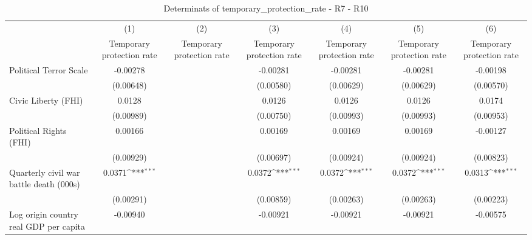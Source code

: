 \begin{table}[htbp]\centering
\def\sym#1{\ifmmode^{#1}\else\(^{#1}\)\fi}
\caption{Determinats of temporary\_protection\_rate - R7 - R10}
\begin{tabular}{l*{6}{c}}
\hline\hline
                    &\multicolumn{1}{c}{(1)}&\multicolumn{1}{c}{(2)}&\multicolumn{1}{c}{(3)}&\multicolumn{1}{c}{(4)}&\multicolumn{1}{c}{(5)}&\multicolumn{1}{c}{(6)}\\
                    &\multicolumn{1}{c}{Temporary protection rate}&\multicolumn{1}{c}{Temporary protection rate}&\multicolumn{1}{c}{Temporary protection rate}&\multicolumn{1}{c}{Temporary protection rate}&\multicolumn{1}{c}{Temporary protection rate}&\multicolumn{1}{c}{Temporary protection rate}\\
\hline
Political Terror Scale&    -0.00278         &                     &    -0.00281         &    -0.00281         &    -0.00281         &    -0.00198         \\
                    &   (0.00648)         &                     &   (0.00580)         &   (0.00629)         &   (0.00629)         &   (0.00570)         \\
[1em]
Civic Liberty (FHI) &      0.0128         &                     &      0.0126         &      0.0126         &      0.0126         &      0.0174         \\
                    &   (0.00989)         &                     &   (0.00750)         &   (0.00993)         &   (0.00993)         &   (0.00953)         \\
[1em]
Political Rights (FHI)&     0.00166         &                     &     0.00169         &     0.00169         &     0.00169         &    -0.00127         \\
                    &   (0.00929)         &                     &   (0.00697)         &   (0.00924)         &   (0.00924)         &   (0.00823)         \\
[1em]
Quarterly civil war battle death (000s)&      0.0371\sym{***}&                     &      0.0372\sym{***}&      0.0372\sym{***}&      0.0372\sym{***}&      0.0313\sym{***}\\
                    &   (0.00291)         &                     &   (0.00859)         &   (0.00263)         &   (0.00263)         &   (0.00223)         \\
[1em]
Log origin country real GDP per capita&    -0.00940         &                     &    -0.00921         &    -0.00921         &    -0.00921         &    -0.00575         \\

\end{tabular}
\end{table}
